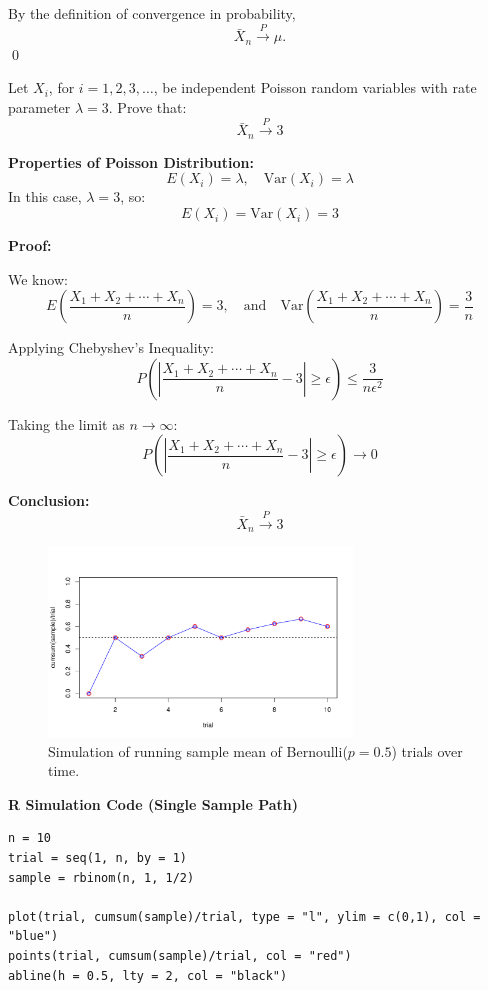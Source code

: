 By the definition of convergence in probability,
\[
\bar{X}_n \xrightarrow{P} \mu.
\]
\qed
\begin{example}

Let \( X_i \), for \( i = 1, 2, 3, \ldots \), be independent Poisson random variables with rate parameter \( \lambda = 3 \). Prove that:
\[
\bar{X}_n \xrightarrow{P} 3
\]

\textbf{Properties of Poisson Distribution:}
\[
E(X_i) = \lambda, \quad \mathrm{Var}(X_i) = \lambda
\]
In this case, \( \lambda = 3 \), so:
\[
E(X_i) = \mathrm{Var}(X_i) = 3
\]

\textbf{Proof:}

We know:
\[
E\left( \frac{X_1 + X_2 + \cdots + X_n}{n} \right) = 3, \quad \text{and} \quad
\mathrm{Var}\left( \frac{X_1 + X_2 + \cdots + X_n}{n} \right) = \frac{3}{n}
\]

Applying Chebyshev’s Inequality:
\[
P\left( \left| \frac{X_1 + X_2 + \cdots + X_n}{n} - 3 \right| \geq \epsilon \right) \leq \frac{3}{n \epsilon^2}
\]

Taking the limit as \( n \to \infty \):
\[
P\left( \left| \frac{X_1 + X_2 + \cdots + X_n}{n} - 3 \right| \geq \epsilon \right) \to 0
\]

\textbf{Conclusion:}
\[
\bar{X}_n \xrightarrow{P} 3
\]
\end{example}
\begin{figure}[H]
  \centering
  \includegraphics[width=0.72\textwidth]{Section5/simulation_plot.pdf}
  \caption{Simulation of running sample mean of Bernoulli(\(p = 0.5\)) trials over time.}
\end{figure}

{\color{gray} \textbf{R Simulation Code (Single Sample Path)}}

\begin{verbatim}
n = 10
trial = seq(1, n, by = 1)
sample = rbinom(n, 1, 1/2)

plot(trial, cumsum(sample)/trial, type = "l", ylim = c(0,1), col = "blue")
points(trial, cumsum(sample)/trial, col = "red")
abline(h = 0.5, lty = 2, col = "black")
\end{verbatim}

